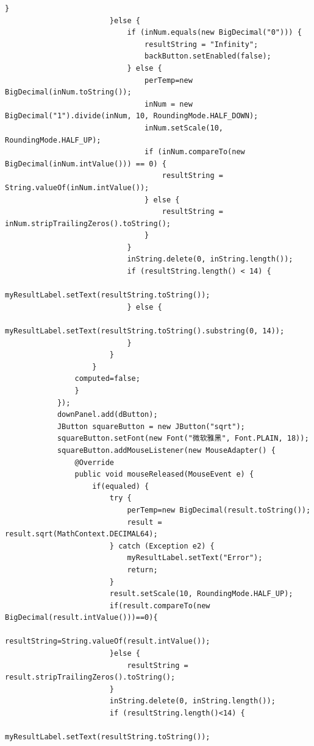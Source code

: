 \documentclass{ctexart}
\begin{document}
\begin{lstlisting}[caption=冗杂的代码]
                            } 
                        }else {
                            if (inNum.equals(new BigDecimal("0"))) {
                                resultString = "Infinity";
                                backButton.setEnabled(false);
                            } else {
                                perTemp=new BigDecimal(inNum.toString());
                                inNum = new BigDecimal("1").divide(inNum, 10, RoundingMode.HALF_DOWN);
                                inNum.setScale(10, RoundingMode.HALF_UP);
                                if (inNum.compareTo(new BigDecimal(inNum.intValue())) == 0) {
                                    resultString = String.valueOf(inNum.intValue());
                                } else {
                                    resultString = inNum.stripTrailingZeros().toString();
                                }
                            }
                            inString.delete(0, inString.length());
                            if (resultString.length() < 14) {
                                myResultLabel.setText(resultString.toString());
                            } else {
                                myResultLabel.setText(resultString.toString().substring(0, 14));
                            } 
                        }
                    }
                computed=false;	
                }
            });
            downPanel.add(dButton);		
            JButton squareButton = new JButton("sqrt");
            squareButton.setFont(new Font("微软雅黑", Font.PLAIN, 18));
            squareButton.addMouseListener(new MouseAdapter() {
                @Override
                public void mouseReleased(MouseEvent e) {
                    if(equaled) {
                        try {
                            perTemp=new BigDecimal(result.toString());
                            result = result.sqrt(MathContext.DECIMAL64);
                        } catch (Exception e2) {
                            myResultLabel.setText("Error");
                            return;
                        }
                        result.setScale(10, RoundingMode.HALF_UP);
                        if(result.compareTo(new BigDecimal(result.intValue()))==0){
                            resultString=String.valueOf(result.intValue());
                        }else {
                            resultString = result.stripTrailingZeros().toString();
                        }
                        inString.delete(0, inString.length());
                        if (resultString.length()<14) {
                            myResultLabel.setText(resultString.toString());

\end{lstlisting}
\end{document}
